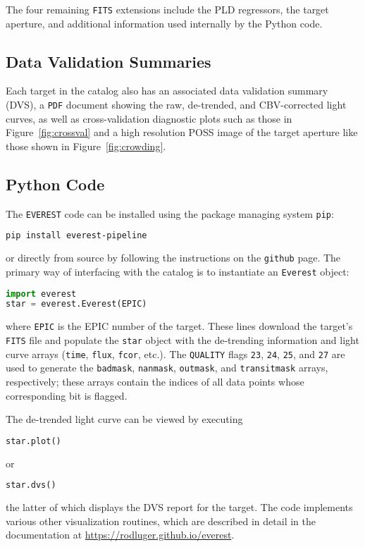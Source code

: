\documentclass[]{emulateapj}
\newcommand{\edited}[1]{{\color{red} #1}}
\begin{document}
The four remaining \texttt{FITS} extensions include the PLD regressors, the target aperture,
and additional information used internally by the Python code.

\subsection{Data Validation Summaries}
\label{sec:dvs}
Each target in the catalog also has an associated data validation summary (DVS), a
\texttt{PDF} document showing the raw, de-trended, and CBV-corrected light curves,
as well as cross-validation diagnostic plots such as those in Figure~\ref{fig:crossval}
and a high resolution POSS image of the target aperture like those shown in
Figure~\ref{fig:crowding}.

\edited{\subsection{Python Code}}
\label{sec:python}
The \texttt{EVEREST} code can be installed using the package managing system \texttt{pip}:
%
\begin{lstlisting}[language=bash]
pip install everest-pipeline
\end{lstlisting}
%
or directly from source by following the instructions on the \texttt{github} page.
The primary way of interfacing
with the catalog is to instantiate an \texttt{Everest} object:
%
\begin{lstlisting}[language=Python]
import everest
star = everest.Everest(EPIC)
\end{lstlisting}
%
where \texttt{EPIC} is the EPIC number of the target. These lines download the
target's \texttt{FITS} file and populate
the \texttt{star} object with the de-trending information and light curve arrays
(\texttt{time}, \texttt{flux}, \texttt{fcor}, etc.).
The \texttt{QUALITY} flags \texttt{23}, \texttt{24}, \texttt{25}, and \texttt{27} are
used to generate the \texttt{badmask}, \texttt{nanmask}, \texttt{outmask}, and
\texttt{transitmask} arrays, respectively; these arrays contain the indices of all
data points whose corresponding bit is flagged.

The de-trended light curve can be viewed by executing
%
\begin{lstlisting}[language=Python]
star.plot()
\end{lstlisting}
%
or
%
\begin{lstlisting}[language=Python]
star.dvs()
\end{lstlisting}
%
the latter of which displays the DVS report for the target.
The code implements various other visualization routines, which are described in
detail in the documentation at \url{https://rodluger.github.io/everest}.
\end{document}
